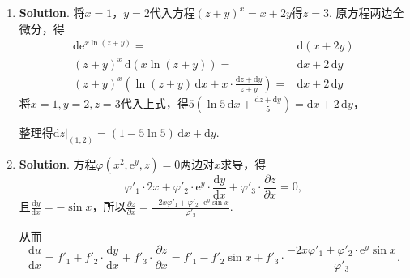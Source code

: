 \documentclass[../main.tex]{subfiles}
\begin{document}
\begin{enumerate}
          切线的方程为$\frac{x-3}{4}=\frac{y-4}{-3}=\frac{z-5}{0}$，

          法平面的方程为$4\cdot(x-3)-3\cdot(y-4)+0\cdot(z-5)=0$，即$4x-3y=0$.

    \item \textbf{Solution}. 将$x=1$，$y=2$代入方程$(z+y)^{x} = x+2y$得$z=3$. 原方程两边全微分，得
          \[
              \begin{aligned}
                  \mathrm{d}\mathrm{e}^{x\ln(z+y)}= {}                                                                   & \mathrm{d}(x+2y)           \\
                  \left(z+y\right)^{x}\,\mathrm{d}\left(x\ln(z+y)\right) = {}                                            & \mathrm{d}x+2\,\mathrm{d}y \\
                  \left(z+y\right)^{x}\left(\ln(z+y)\,\mathrm{d}x+x\cdot \frac{\mathrm{d}z+\mathrm{d}y}{z+y}\right) = {} & \mathrm{d}x+2\,\mathrm{d}y
              \end{aligned}
          \]
          将$x=1,y=2,z=3$代入上式，得$5\left(\ln 5\,\mathrm{d}x+\frac{\mathrm{d}z+\mathrm{d}y}{5}
              \right)=\mathrm{d}x+2\,\mathrm{d}y$，

          整理得$\left.\mathrm{d}z\right|_{(1,2)}= \left(1-5\ln 5\right)\,\mathrm{d}x +
              \mathrm{d}y$.

    \item \textbf{Solution}. 方程$\varphi\left(x^{2},\mathrm{e}^{y},z\right)=0$两边对$x$求导，得
          \[
              \varphi'_{1}\cdot 2x + \varphi'_{2}\cdot \mathrm{e}^{y}\cdot \frac{\mathrm{d}y}{\mathrm{d}x}
              + \varphi'_{3}\cdot \frac{\partial z}{\partial x}= 0,
          \]
          且$\frac{\mathrm{d}y}{\mathrm{d}x}=-\sin x$，所以$\frac{\partial z}{\partial
                  x}= \frac{-2x\varphi'_{1}+\varphi'_{2}\cdot \mathrm{e}^{y}\sin x}{\varphi'_{3}}$.

          从而
          \[
              \frac{\mathrm{d}u}{\mathrm{d}x}=f'_{1}+f'_{2}\cdot \frac{\mathrm{d}y}{\mathrm{d}x}
              +f'_{3}\cdot \frac{\partial z}{\partial x}= f'_{1} - f'_{2}\sin x + f'_{3}\cdot
              \frac{-2x\varphi'_{1}+\varphi'_{2}\cdot \mathrm{e}^{y}\sin x}{\varphi'_{3}}.
          \]


\end{enumerate}
\end{document}
